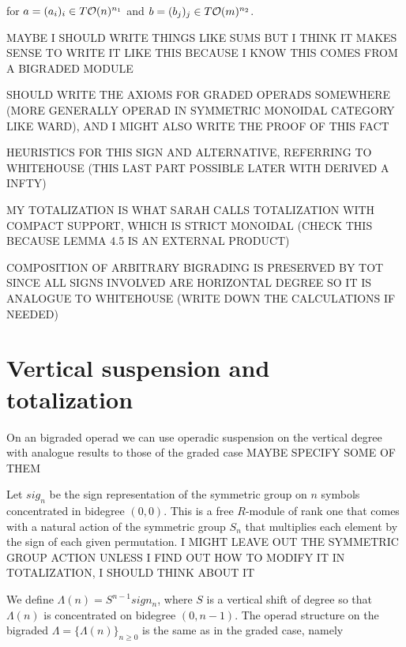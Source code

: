 \documentclass[twoside]{article}
\begin{document}
for $a=(a_i)_i\in T{\mathcal O}(n)^{n_1}$ and $b=(b_j)_j\in T{\mathcal O}(m)^{n_2}$.


MAYBE I SHOULD WRITE THINGS LIKE SUMS BUT I THINK IT MAKES SENSE TO WRITE IT LIKE THIS BECAUSE I KNOW THIS COMES FROM A BIGRADED MODULE


SHOULD WRITE THE AXIOMS FOR GRADED OPERADS SOMEWHERE (MORE GENERALLY OPERAD IN SYMMETRIC MONOIDAL CATEGORY LIKE WARD), AND I MIGHT ALSO WRITE THE PROOF OF THIS FACT

HEURISTICS FOR THIS SIGN AND ALTERNATIVE, REFERRING TO WHITEHOUSE (THIS  LAST PART POSSIBLE LATER WITH DERIVED A INFTY)

MY TOTALIZATION IS WHAT SARAH CALLS TOTALIZATION WITH COMPACT SUPPORT, WHICH IS STRICT MONOIDAL (CHECK THIS BECAUSE LEMMA 4.5 IS AN EXTERNAL PRODUCT)

COMPOSITION OF ARBITRARY BIGRADING IS PRESERVED BY TOT SINCE ALL SIGNS INVOLVED ARE HORIZONTAL DEGREE SO IT IS ANALOGUE TO WHITEHOUSE (WRITE DOWN THE CALCULATIONS IF NEEDED)

\section{Vertical suspension and totalization}
On an bigraded operad we can use operadic suspension on the vertical degree with analogue results to those of the graded case MAYBE SPECIFY SOME OF THEM



Let $sig_n$ be the sign representation of the symmetric group on $n$ symbols concentrated in bidegree $(0,0)$. This is a free $R$-module of rank one that comes with a natural action of the symmetric group $S_n$ that multiplies each element by the sign of each given permutation. I MIGHT LEAVE OUT THE SYMMETRIC GROUP  ACTION UNLESS I FIND OUT HOW TO MODIFY IT IN TOTALIZATION, I SHOULD THINK ABOUT IT

We define $\Lambda(n)=S^{n-1}sign_n$, where  $S$ is a vertical shift of degree so that $\Lambda(n)$ is concentrated on bidegree  $(0,n-1)$.
The operad structure on the bigraded $\Lambda=\{\Lambda(n)\}_{n\geq 0}$ is the same as in the graded case, namely
\end{document}
